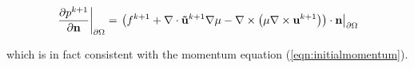 \documentclass[letterpaper]{erdc}
\begin{document}
\begin{equation}
  \left.\frac{\partial p^{k+1}}{\partial \textbf{n}}\right|_{\partial\Omega} = \left.\left(f^{k+1} + \nabla\cdot\mathbf{\tilde{u}}^{k+1}\nabla\mu - \nabla\times\left(\mu\nabla\times \textbf{u}^{k+1}  \right)  \right)\cdot \textbf{n}\right|_{\partial\Omega}
\end{equation}

which is in fact consistent with the momentum equation (\ref{eqn:initialmomentum}).







%
%
\end{document}
